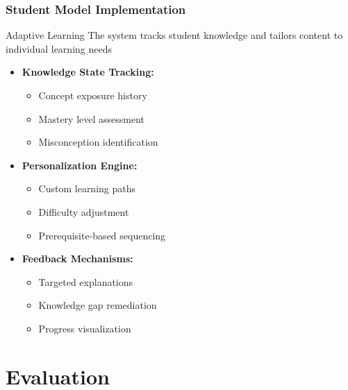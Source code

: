 \documentclass{beamer}
\begin{document}
\begin{frame}
\frametitle{Student Model Implementation}

\begin{block}{Adaptive Learning}
The system tracks student knowledge and tailors content to individual learning needs \cite{rodriguez2024adaptive}
\end{block}

\begin{itemize}
    \item<1-> \textbf{Knowledge State Tracking:}
    \begin{itemize}
        \item Concept exposure history
        \item Mastery level assessment
        \item Misconception identification
    \end{itemize}
    \item<2-> \textbf{Personalization Engine:}
    \begin{itemize}
        \item Custom learning paths
        \item Difficulty adjustment
        \item Prerequisite-based sequencing
    \end{itemize}
    \item<3-> \textbf{Feedback Mechanisms:}
    \begin{itemize}
        \item Targeted explanations
        \item Knowledge gap remediation
        \item Progress visualization
    \end{itemize}
\end{itemize}
\end{frame}

\section{Evaluation}
\end{document}
